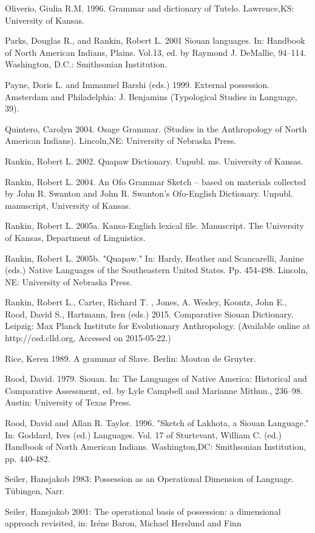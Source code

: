\documentclass[output=paper]{LSP/langsci}
\begin{document}
\begin{reflist}
Oliverio, Giulia R.M. 1996. Grammar and dictionary of Tutelo. Lawrence,KS: University of Kansas.

Parks, Douglas R., and Rankin, Robert L. 2001 Siouan languages. In: Handbook of North American Indians, Plains. Vol.13, ed. by Raymond J. DeMallie, 94–114. Washington, D.C.: Smithsonian Institution.

Payne, Doris L. and Immanuel Barshi (eds.) 1999. External possession. Amsterdam and Philadelphia: J. Benjamins (Typological Studies in Language, 39).

Quintero, Carolyn 2004. Osage Grammar. (Studies in the Anthropology of North American Indians). Lincoln,NE: University of Nebraska Press.

Rankin, Robert L. 2002. Quapaw Dictionary. Unpubl. ms. University of Kansas.

Rankin, Robert L. 2004. An Ofo Grammar Sketch – based on materials collected by John R. Swanton and John R. Swanton's Ofo-English Dictionary. Unpubl. manuscript, University of Kansas. 

Rankin, Robert L. 2005a. Kansa-English lexical file. Manuscript. The University of Kansas, Department of Linguistics.

Rankin, Robert L. 2005b. "Quapaw." In: Hardy, Heather and Scancarelli, Janine (eds.) Native Languages of the Southeastern United States. Pp. 454-498. Lincoln, NE: University of Nebraska Press.

Rankin, Robert L., Carter, Richard T. , Jones, A. Wesley, Koontz, John E., Rood, David S., Hartmann, Iren (eds.) 2015. Comparative Siouan Dictionary. Leipzig: Max Planck Institute for Evolutionary Anthropology. (Available online at http://csd.clld.org, Accessed on 2015-05-22.)

Rice, Keren 1989. A grammar of Slave. Berlin: Mouton de Gruyter.

Rood, David. 1979. Siouan. In: The Languages of Native America: Historical and Comparative Assessment, ed. by Lyle Campbell and Marianne Mithun., 236–98. Austin: University of Texas Press.

Rood, David and Allan R. Taylor. 1996. "Sketch of Lakhota, a Siouan Language." In: Goddard, Ives (ed.) Languages. Vol. 17 of Sturtevant, William C. (ed.) Handbook of North American Indians. Washington,DC: Smithsonian Institution, pp. 440-482.

Seiler, Hansjakob 1983: Possession as an Operational Dimension of Language. Tübingen, Narr.

Seiler, Hansjakob 2001: The operational basis of possession: a dimensional approach revisited, in: Iréne Baron, Michael Herslund and Finn 


\end{reflist}
\end{document}
